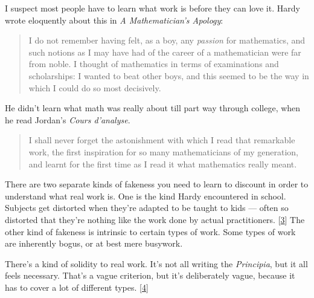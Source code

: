 I suspect most people
                  have to learn what work is before they can love it. Hardy
                  wrote eloquently about this in
                  \emph{A Mathematician's Apology}:
                  \begin{quote}

                    I do not remember having felt, as a boy, any
                    \emph{passion} for mathematics, and such notions as I may
                    have had of the career of a mathematician were far from
                    noble. I thought of mathematics in terms of examinations and
                    scholarships: I wanted to beat other boys, and this seemed
                    to be the way in which I could do so most decisively.
                  
\end{quote}

                  He didn't learn what math was really about till part way
                  through college, when he read Jordan's \emph{Cours d'analyse}.
                  \begin{quote}

                    I shall never forget the astonishment with which I read that
                    remarkable work, the first inspiration for so many
                    mathematicians of my generation, and learnt for the first
                    time as I read it what mathematics really meant.
                  
\end{quote}

                  There are two separate kinds of fakeness you need to learn to
                  discount in order to understand what real work is. One is the
                  kind Hardy encountered in school. Subjects get distorted when
                  they're adapted to be taught to kids --- often so
                  distorted that they're nothing like the work done by actual
                  practitioners.
                  [\href{\#f3n}{3}]
                  The other kind of fakeness is intrinsic to certain types of
                  work. Some types of work are inherently bogus, or at best mere
                  busywork.

There's a kind of solidity to real work.
                  It's not all writing the \emph{Principia}, but it all feels
                  necessary. That's a vague criterion, but it's deliberately
                  vague, because it has to cover a lot of different types.
                  [\href{\#f4n}{4}]

